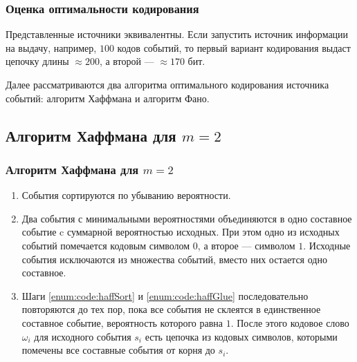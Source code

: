 \begin{frame}
    \frametitle{Оценка оптимальности кодирования}
    
    Представленные источники \alert{эквивалентны}. Если запустить источник информации на выдачу, например, $100$ кодов событий, то первый вариант кодирования выдаст цепочку длины $\approx 200$, а второй --- $\approx 170$ бит.
\end{frame}

Далее рассматриваются два алгоритма оптимального кодирования источника событий: алгоритм Хаффмана и алгоритм Фано. 


\subsection{Алгоритм Хаффмана для $m=2$}

\begin{frame}
    \frametitle{Алгоритм Хаффмана для $m=2$}
    
    \begin{enumerate}
        \item\label{enum:code:haffSort} 
        События сортируются по убыванию вероятности.
        
        \item\label{enum:code:haffGlue} 
        Два события с минимальными вероятностями объединяются в одно составное событие c суммарной вероятностью исходных. При этом одно из исходных событий помечается кодовым символом $0$, а второе --- символом $1$. Исходные события исключаются из множества событий, вместо них остается одно составное.
        
        \item Шаги \ref{enum:code:haffSort} и \ref{enum:code:haffGlue} последовательно повторяются до тех пор, пока все события не склеятся в единственное составное событие, вероятность которого равна $1$. После этого кодовое слово $\omega_i$ для исходного события $s_i$ есть цепочка из кодовых символов, которыми помечены все составные события от  корня до $s_i$.
    \end{enumerate}
\end{frame}

